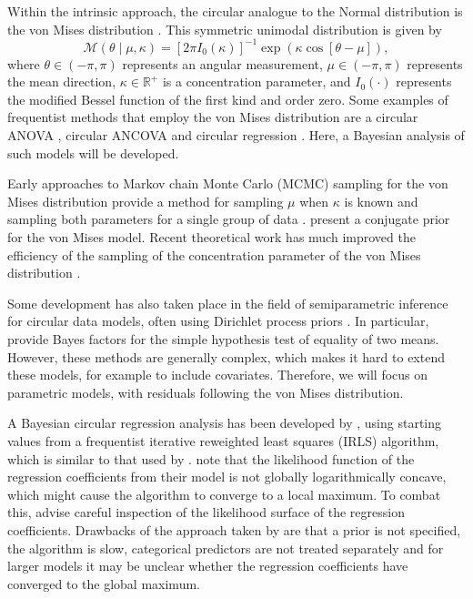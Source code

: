 Within the intrinsic approach, the circular analogue to the Normal distribution is the von Mises distribution \citep{von1918ganzzahligkeit}. This symmetric unimodal distribution is given by
\begin{equation}
\mathcal{M}(\theta \mid \mu, \kappa) = \left[ 2 \pi I_0(\kappa) \right]^{-1}
\exp \left( \kappa \cos \left[ \theta - \mu \right] \right),
\end{equation}
where \( \theta \in (-\pi, \pi) \) represents an angular measurement, \( \mu \in (-\pi, \pi) \) represents the mean direction, \( \kappa \in \mathbb{R}^+ \) is a concentration parameter, and \( I_0(\cdot) \) represents the modified Bessel function of the first kind and order zero. Some examples of frequentist methods that employ the von Mises distribution are a circular ANOVA \citep{watson1956construction}, circular ANCOVA \citep{artes2008hypothesis} and circular regression \citep{fisher1992regression}. Here, a Bayesian analysis of such models will be developed.

Early approaches to Markov chain Monte Carlo (MCMC) sampling for the von Mises distribution provide a method for sampling \( \mu \) when \( \kappa \) is known \citep{mardia1976bayesian} and sampling both parameters for a single group of data \citep{damien1999fullbayes}. \citet{guttorp1988finding} present a conjugate prior for the von Mises model. Recent theoretical work has much improved the efficiency of the sampling of the concentration parameter of the von Mises distribution \citep{forbes2015fast}.

Some development has also taken place in the field of semiparametric inference for circular data models, often using Dirichlet process priors \citep{Bhattacharya2009, ghosh2003semiparametric, george2006semiparametric, mcvinish2008semiparametric}. In particular, \citet{ghosh2003semiparametric} provide Bayes factors for the simple hypothesis test of equality of two means. However, these methods are generally complex, which makes it hard to extend these models, for example to include covariates. Therefore, we will focus on parametric models, with residuals following the von Mises distribution.

A Bayesian circular regression analysis has been developed by \citet{gill2010}, using starting values from a frequentist iterative reweighted least squares (IRLS) algorithm, which is similar to that used by \citet{fisher1992regression}. \citet{gill2010} note that the likelihood function of the regression coefficients from their model is not globally logarithmically concave, which might cause the algorithm to converge to a local maximum. To combat this, \citet{gill2010} advise careful inspection of the likelihood surface of the regression coefficients. Drawbacks of the approach taken by \citet{gill2010} are that a prior is not specified, the algorithm is slow, categorical predictors are not treated separately and for larger models it may be unclear whether the regression coefficients have converged to the global maximum.


